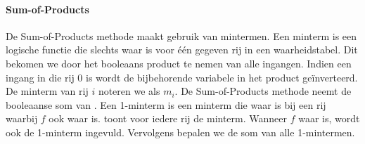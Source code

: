 \paragraph{Sum-of-Products} De Sum-of-Products methode maakt gebruik van mintermen. Een minterm is een logische functie die slechts waar is voor \'e\'en gegeven rij in een waarheidstabel. Dit bekomen we door het booleaans product te nemen van alle ingangen. Indien een ingang in die rij $0$ is wordt de bijbehorende variabele in het product ge\"inverteerd. De minterm van rij $i$ noteren we als $m_i$. De Sum-of-Products methode neemt de booleaanse som van . Een 1-minterm is een minterm die waar is bij een rij waarbij $f$ ook waar is.  toont voor iedere rij de minterm. Wanneer $f$ waar is, wordt ook de 1-minterm ingevuld. Vervolgens bepalen we de som van alle 1-mintermen.

